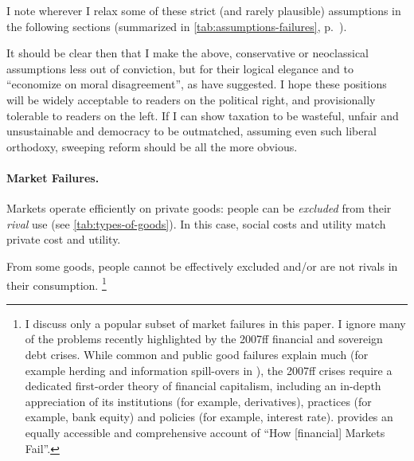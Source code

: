 I note wherever I relax some of these strict (and rarely plausible) assumptions in the following sections (summarized in \autoref{tab:assumptions-failures}, p.~\pageref{tab:assumptions-failures}).

It should be clear then that I make the above, conservative or neoclassical assumptions less out of conviction, but for their logical elegance and to ``economize on moral disagreement'', as \cite[K226]{GutmannThompson-2004-aa} have suggested.
I hope these positions will be widely acceptable to readers on the political right, and provisionally tolerable to readers on the left.
If I can show taxation to be wasteful, unfair and unsustainable and democracy to be outmatched, assuming even such liberal orthodoxy, sweeping reform should be all the more obvious.

	

\paragraph{Market Failures.}  \label{sec:market-failures}
Markets operate efficiently on private goods:
people can be \emph{excluded} from their \emph{rival} use (see \autoref{tab:types-of-goods}).
In this case, social costs and utility match private cost and utility.

From some goods, people cannot be effectively excluded and/or are not rivals in their consumption.
\footnote{
	I discuss only a popular subset of market failures in this paper.
	I ignore many of the problems recently highlighted by the 2007ff financial and sovereign debt crises.
	While common and public good failures explain much (for example herding and information spill-overs in \citealt{Banerjee-1992-aa}), the 2007ff crises require a dedicated first-order theory of financial capitalism, including an in-depth appreciation of its institutions (for example, derivatives), practices (for example, bank equity) and policies (for example, interest rate).
	\cite{Cassidy2010} provides an equally accessible and comprehensive account of ``How [financial] Markets Fail''.
}

